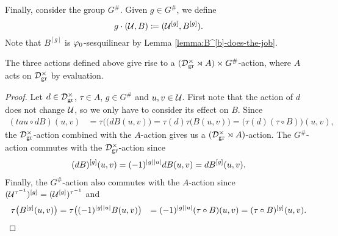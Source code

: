 Finally, consider the group $G^\#$. 
Given $g \in G^\#$, we define
\begin{equation}\label{eq:G-action}
    g \cdot (\mathcal U, B) \coloneqq (\mathcal U^{[g]}, B^{[g]}).
\end{equation}
Note that $B^{[g]}$ is $\varphi_0$-sesquilinear by Lemma \ref{lemma:B^[b]-does-the-job}.

\begin{lemma}\label{lemma:action-on-(U,B)}
    The three actions defined above give rise to a $(\mathcal{D}^\times_{\mathrm{gr}} \rtimes A) \times G^\#$-action, where $A$ acts on $\mathcal{D}^\times_{\mathrm{gr}}$ by evaluation. 
\end{lemma}

\begin{proof}
    Let $d\in \mathcal{D}^\times_{\mathrm{gr}}$, $\tau \in A$, $g \in G^\#$ and $u, v \in \mathcal U$. 
    First note that the action of $d$ does not change $\mathcal U$, so we only have to consider its effect on $B$. 
    Since 
    \begin{align*}
        (tau \circ dB)(u,v) &= \tau \big( (d B(u,v) \big) = \tau (d) \tau \big( B(u,v) \big) = \big( \tau(d) (\tau \circ B) \big) (u,v),
    \end{align*}
    the $\mathcal{D}^\times_{\mathrm{gr}}$-action combined with the $A$-action gives us a $(\mathcal{D}^\times_{\mathrm{gr}} \rtimes A)$-action. 
    The $G^\#$-action commutes with the $\mathcal{D}^\times_{\mathrm{gr}}$-action since 
    \begin{align*}
        (dB)^{[g]} (u, v) = (-1)^{|g||u|} dB(u,v) = d B^{[g]}(u,v).
    \end{align*}
    Finally, the $G^\#$-action also commutes with the $A$-action since $(\mathcal U^{\tau^{-1}})^{[g]} = (\mathcal U^{[g]})^{\tau^{-1}}$ and 
    \begin{align*}
        \tau \big(B^{[g]} (u,v) \big) 
        &= \tau \big( (-1)^{|g||u|} B(u,v) \big)
        &= (-1)^{|g||u|} (\tau \circ B) (u,v) = (\tau \circ B)^{[g]} (u,v).
    \end{align*}
\end{proof}


